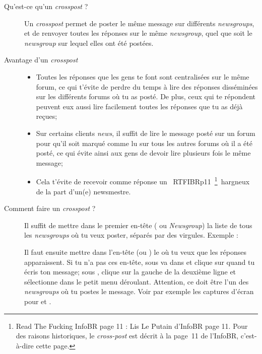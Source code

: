 \begin{description}

\item[Qu'est-ce qu'un \emph{crosspost} ?]
Un \emph{crosspost} permet de poster le même message sur différents \emph{newsgroups}, et de renvoyer toutes les réponses sur le même \emph{newsgroup}, quel
que soit le \emph{newsgroup} sur lequel elles ont été postées.

\item[Avantage d'un \emph{crosspost}]
\begin{itemize}
 \item Toutes les réponses que les gens te font sont centralisées sur le même forum,
       ce qui t'évite de perdre du temps à lire des réponses disséminées
       sur les différents forums où tu as posté.
       De plus, ceux qui te répondent peuvent eux aussi lire facilement toutes les réponses
       que tu as déjà reçues;
 \item Sur certains clients \emph{news}, il suffit de lire le message posté sur un forum
       pour qu'il soit marqué comme lu sur tous les autres forums où il a été posté,
       ce qui évite ainsi aux gens de devoir lire plusieurs fois le même message;
 \item Cela t'évite de recevoir comme réponse un \guillemotleft~RTFIBRp11~\footnote{Read The Fucking InfoBR page 11 : Lis Le Putain d'InfoBR page 11. Pour des raisons historiques, le \emph{cross-post} est décrit à la page~11 de l'InfoBR, c'est-à-dire cette page.}~\guillemotright  hargneux de la part d'un(e) newsmestre.
\end{itemize}

\item[Comment faire un \emph{crosspost} ?]
Il suffit de mettre dans le premier en-tête ( ou \emph{Newsgroup}) la liste de tous les \emph{newsgroups} où tu veux
poster, séparés par des virgules. Exemple : 

Il faut ensuite mettre dans l'en-tête  (ou ) le  où tu veux que les réponses apparaissent. Si
tu n'a pas ces en-tête, sous  va dans  et clique sur  quand tu écris ton message; sous
, clique sur la gauche de la deuxième ligne et sélectionne  dans le petit menu déroulant. Attention, ce doit être
l'un des \emph{newsgroups} où tu postes le message.
Voir par exemple les captures d'écran pour  et .\\


\end{description}
